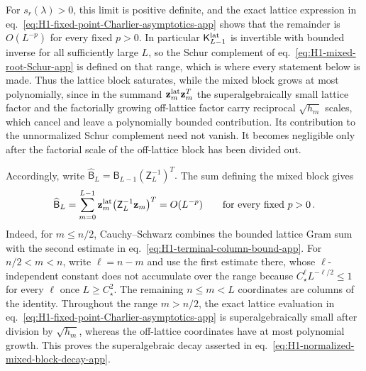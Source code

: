 \documentclass[a4paper,11pt]{article}
\theoremstyle{definition}
\theoremstyle{remark}
\begin{document}
For $s_r(\lambda)>0$, this limit is positive definite, and the exact lattice expression in
eq.~\eqref{eq:H1-fixed-point-Charlier-asymptotics-app} shows
that the remainder is \(O(L^{-p})\) for every fixed \(p>0\). In particular
$\mathsf K_{L-1}^{\rm lat}$ is invertible with bounded inverse for all sufficiently large $L$, so
the Schur complement of eq.~\eqref{eq:H1-mixed-root-Schur-app} is defined on that range, which is
where every statement below is made. Thus the lattice
block saturates, while the mixed block grows at most polynomially, since in the summand
$\mathbf z_m^{\rm lat}\mathbf z_m^{T}$ the superalgebraically small lattice factor and the
factorially growing off-lattice factor carry reciprocal $\sqrt{h_m}$ scales, which cancel and
leave a polynomially bounded contribution. Its
contribution to the unnormalized Schur complement need not vanish. It
becomes negligible only after the factorial scale of the off-lattice
block has been divided out.

Accordingly, write
$
    \widehat{\mathsf B}_L
    =
   \mathsf B_{L-1}(\mathsf Z_L^{-1})^T.
$
The sum defining the mixed block gives
\begin{equation}
   \widehat{\mathsf B}_L
   =
   \sum_{m=0}^{L-1}
   \mathbf z_m^{\rm lat}
   \bigl(\mathsf Z_L^{-1}\mathbf z_m\bigr)^T
   =O(L^{-p})
   \qquad\text{for every fixed }p>0\,.
   \label{eq:H1-normalized-mixed-block-decay-app}
\end{equation}
Indeed, for \(m\le n/2\), Cauchy--Schwarz combines the bounded lattice
Gram sum with the second estimate in
eq.~\eqref{eq:H1-terminal-column-bound-app}. For \(n/2<m<n\), write
\(\ell=n-m\) and use the first estimate there, whose $\ell$-independent constant does not
accumulate over the range because $C_\star^{\ell}L^{-\ell/2}\le1$ for every $\ell$ once
$L\ge C_\star^{2}$. The remaining
\(n\le m<L\) coordinates are columns of the identity. Throughout the
range \(m>n/2\), the exact
lattice evaluation in
eq.~\eqref{eq:H1-fixed-point-Charlier-asymptotics-app} is
superalgebraically small after division by \(\sqrt{h_m}\), whereas the
off-lattice coordinates have at most polynomial growth. This proves the superalgebraic decay asserted in eq.~\eqref{eq:H1-normalized-mixed-block-decay-app}.
\end{document}

